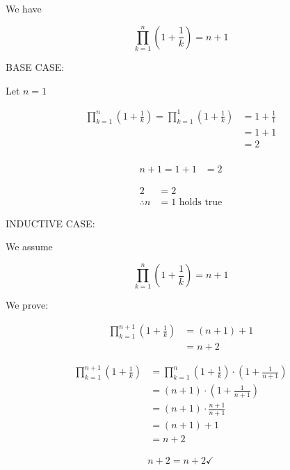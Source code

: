 \documentclass[../Main.tex]{subfiles}
\begin{document}
We have

$$\prod_{k = 1}^{n} (1 + \frac{1}{k}) = n + 1$$

\begin{poof}

    BASE CASE:

    Let $n = 1$

    \begin{align*}
        \prod_{k = 1}^{n} (1 + \frac{1}{k}) = \prod_{k = 1}^{1} (1 + \frac{1}{k}) &= 1 + \frac{1}{1} \\
        &= 1 + 1 \\
        &= \boxed{2} \\
    \end{align*}

    \begin{align*}
        n + 1 = 1 + 1 &= \boxed{2}
    \end{align*}

    \begin{align*}
        2 &= 2 \\
        \therefore n &= 1 \text{ holds true}
    \end{align*}

    INDUCTIVE CASE:

    We assume

    $$\prod_{k = 1}^{n} (1 + \frac{1}{k}) = n + 1$$

    We prove:

    \begin{align*}
        \prod_{k = 1}^{n + 1} (1 + \frac{1}{k}) &= (n + 1) + 1 \\
        &= n + 2
    \end{align*}

    \begin{align*}
        \prod_{k = 1}^{n + 1} (1 + \frac{1}{k}) &= \prod_{k = 1}^{n} (1 + \frac{1}{k}) \cdot (1 + \frac{1}{n + 1}) \\
        &= (n + 1) \cdot (1 + \frac{1}{n + 1}) \\
        &= (n + 1) \cdot \frac{n + 1}{n + 1} \\
        &= (n + 1) + 1 \\
        &= \boxed{n + 2}
    \end{align*}

    \begin{align*}
        n + 2 = n + 2 \checkmark
    \end{align*}

\end{poof}

\end{document}
